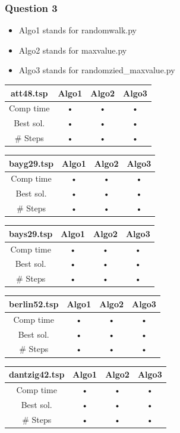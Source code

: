 \documentclass[a4paper,10pt]{article}
\begin{document}
\subsubsection{Question 3}
\begin{itemize}
\itemsep0em
\item Algo1 stands for randomwalk.py
\item Algo2 stands for maxvalue.py
\item Algo3 stands for randomzied\_maxvalue.py \\
\end{itemize}
\begin{center}
\begin{tabular}{|c|c|c|c|}
\hline 
att48.tsp & Algo1 & Algo2 & Algo3 \\ 
\hline 
Comp time & • & • & • \\ 
\hline 
Best sol. & • & • & • \\ 
\hline 
\# Steps & • & • & • \\ 
\hline 
\end{tabular} 
\quad
\begin{tabular}{|c|c|c|c|}
\hline 
bayg29.tsp & Algo1 & Algo2 & Algo3 \\ 
\hline 
Comp time & • & • & • \\ 
\hline 
Best sol. & • & • & • \\ 
\hline 
\# Steps & • & • & • \\ 
\hline 
\end{tabular} 
\end{center}
\begin{center}
\begin{tabular}{|c|c|c|c|}
\hline 
bays29.tsp & Algo1 & Algo2 & Algo3 \\ 
\hline 
Comp time & • & • & • \\ 
\hline 
Best sol. & • & • & • \\ 
\hline 
\# Steps & • & • & • \\ 
\hline 
\end{tabular} 
\quad
\begin{tabular}{|c|c|c|c|}
\hline 
berlin52.tsp & Algo1 & Algo2 & Algo3 \\ 
\hline 
Comp time & • & • & • \\ 
\hline 
Best sol. & • & • & • \\ 
\hline 
\# Steps & • & • & • \\ 
\hline 
\end{tabular} 
\end{center}
\begin{center}
\begin{tabular}{|c|c|c|c|}
\hline 
dantzig42.tsp & Algo1 & Algo2 & Algo3 \\ 
\hline 
Comp time & • & • & • \\ 
\hline 
Best sol. & • & • & • \\ 
\hline 
\# Steps & • & • & • \\ 
\hline 
\end{tabular} 
\end{center}
\end{document}
